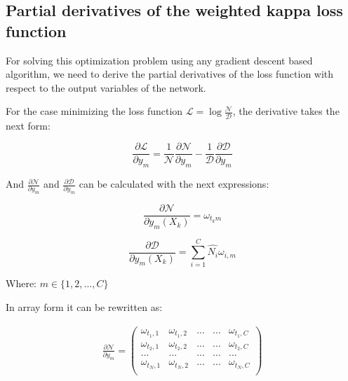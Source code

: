 \subsection{Partial derivatives of the weighted kappa loss function}

For solving this optimization problem using any gradient descent based algorithm, we need to derive the partial derivatives of the loss function with respect to the output variables of the network. 

For the case minimizing the loss function $\mathcal{L} = \log{ \frac{\mathcal{N}}{\mathcal{D}}}$, the derivative takes the next form:

\begin{equation}
\frac{\partial \mathcal{L}}{\partial y_m} = \frac{1}{\mathcal{N}}\frac{\partial \mathcal{N}}{\partial y_m} - \frac{1}{\mathcal{D}}
\frac{\partial{\mathcal{D}}}{\partial y_m}
\end{equation}

And $\frac{\partial \mathcal{N}}{\partial y_m}$ and $\frac{\partial{\mathcal{D}}}{\partial y_m}$ can be calculated with the next expressions:

\begin{equation}
\frac{\partial \mathcal{N}}{\partial y_m(X_k)} = \omega_{t_k m}
\end{equation}

\begin{equation}
\frac{\partial \mathcal{D}}{\partial y_m(X_k)} = \sum_{i=1}^{C} \hat{N_i} \omega_{i,m}
\end{equation}

Where:  $m \in \{1, 2, ..., C\}$

In array form it can be rewritten as:

\begin{equation}
\begin{aligned}
\frac{\partial \mathcal{N}}{\partial y_m} =
\begin{pmatrix} 
\omega_{t_1, 1}     & \omega_{t_1, 2}     & ...     & ... & \omega_{t_1, C}\\ 
\omega_{t_2, 1}     & \omega_{t_2, 2}     & ...     & ... & \omega_{t_2, C}\\ 
...					& ...		          & ...     & ... & ...\\
\omega_{t_N, 1}     & \omega_{t_N, 2}     & ...     & ... & \omega_{t_N, C}\\  
\end{pmatrix}
\end{aligned}
\end{equation}

